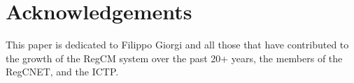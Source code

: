 
\section*{Acknowledgements}

This paper is dedicated to Filippo Giorgi and all those that have contributed
to the growth of the RegCM system over the past 20+ years, the members of the
RegCNET, and the ICTP.

